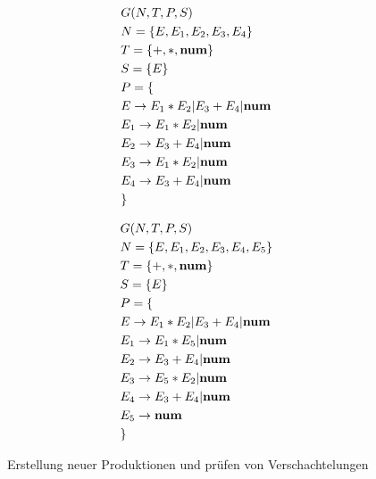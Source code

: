 \documentclass[runningheads]{llncs}
\begin{document}
    \begin{figure}
        \begin{minipage}{0.48\textwidth}
            \begin{flushleft}
                \begin{align*}
                    & G(N,T,P,S) \\
                    & N= \{E, E_1, E_2, E_3, E_4\} \\
                    & T= \{+, *, \bold{num}\} \\
                    & S= \{E\} \\
                    & P = \{ \\
                    & E     \rightarrow E_1 * E_2 | E_3 + E_4 | \bold{num} \\
                    & E_1   \rightarrow E_1 * E_2 | \bold{num} \\
                    & E_2   \rightarrow E_3 + E_4 | \bold{num} \\
                    & E_3   \rightarrow E_1 * E_2 | \bold{num} \\
                    & E_4   \rightarrow E_3 + E_4 | \bold{num} \\
                    & \}
                \end{align*}
            \end{flushleft}
        \end{minipage}
        \hfill
        \begin{minipage}{0.48\textwidth}
            \begin{align*}
                & G(N,T,P,S) \\
                & N= \{E, E_1, E_2, E_3, E_4, E_5\} \\
                & T= \{+, *, \bold{num}\} \\
                & S= \{E\} \\
                & P = \{ \\
                & E     \rightarrow E_1 * E_2 | E_3 + E_4 | \bold{num} \\
                & E_1   \rightarrow E_1 * E_5 | \bold{num} \\
                & E_2   \rightarrow E_3 + E_4 | \bold{num} \\
                & E_3   \rightarrow E_5 * E_2 | \bold{num} \\
                & E_4   \rightarrow E_3 + E_4 | \bold{num} \\
                & E_5   \rightarrow \bold{num} \\
                & \}
            \end{align*}
        \end{minipage}
        \caption{Erstellung neuer Produktionen und prüfen von Verschachtelungen}
        \label{fig:figure9}
    \end{figure}
\end{document}
